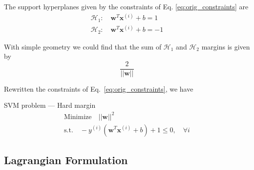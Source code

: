 \documentclass{beamer}
\begin{document}
\begin{frame}
    The support hyperplanes given by the constraints of Eq. \eqref{eq:orig_constraints}
    are
    \begin{equation}
        \begin{array}{l}
            \mathcal{H}_1: \quad \mathbf{w}^T \mathbf{x}^{(i)} + b = 1\\[.2cm]
            \mathcal{H}_2: \quad \mathbf{w}^T \mathbf{x}^{(i)} + b = -1
        \end{array}
    \end{equation}

    With simple geometry we could find that the sum of $\mathcal{H}_1$ and $\mathcal{H}_2$
    margins is given by
    $$
    \frac{2}{||\mathbf{w}||}
    $$


    Rewritten the constraints of Eq.~\eqref{eq:orig_constraints}, we have

    \begin{block}{SVM problem --- Hard margin}
    \begin{equation}
        \begin{array}{l}
            \mbox{Minimize} \quad ||\mathbf{w}||^2\\[.2cm]
            \mbox{s.t.} \quad 
            - y^{(i)} \left( \mathbf{w}^T \mathbf{x}^{(i)} + b \right) + 1 \le 0,
            \quad \forall i
        \end{array}
    \end{equation}
    \end{block}
    
\end{frame}

\subsection{Lagrangian Formulation}

\end{document}
